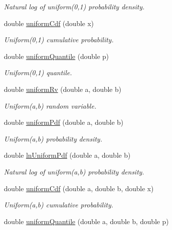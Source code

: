 \begin{DoxyCompactItemize}
\begin{DoxyCompactList}\small\item\em Natural log of uniform(0,1) probability density. \end{DoxyCompactList}\item 
double \mbox{\hyperlink{class_mb_random_aa975313092805421e835bfa934512111}{uniform\+Cdf}} (double x)
\begin{DoxyCompactList}\small\item\em Uniform(0,1) cumulative probability. \end{DoxyCompactList}\item 
double \mbox{\hyperlink{class_mb_random_ade8b412ea092c006f041ac7034e9b102}{uniform\+Quantile}} (double p)
\begin{DoxyCompactList}\small\item\em Uniform(0,1) quantile. \end{DoxyCompactList}\item 
double \mbox{\hyperlink{class_mb_random_a277d841d32f82f756c95b87eb6184ed2}{uniform\+Rv}} (double a, double b)
\begin{DoxyCompactList}\small\item\em Uniform(a,b) random variable. \end{DoxyCompactList}\item 
double \mbox{\hyperlink{class_mb_random_a9db5772a5efc8c19681c46fcbfb60972}{uniform\+Pdf}} (double a, double b)
\begin{DoxyCompactList}\small\item\em Uniform(a,b) probability density. \end{DoxyCompactList}\item 
double \mbox{\hyperlink{class_mb_random_ae9126d13b2ea42cc8f51ec8e400a2ba0}{ln\+Uniform\+Pdf}} (double a, double b)
\begin{DoxyCompactList}\small\item\em Natural log of uniform(a,b) probability density. \end{DoxyCompactList}\item 
double \mbox{\hyperlink{class_mb_random_adbc7c859738c1cc4bcf485fc835db98e}{uniform\+Cdf}} (double a, double b, double x)
\begin{DoxyCompactList}\small\item\em Uniform(a,b) cumulative probability. \end{DoxyCompactList}\item 
double \mbox{\hyperlink{class_mb_random_a086d186a0bc4d52738dd571dc9f0b8e2}{uniform\+Quantile}} (double a, double b, double p)

\end{DoxyCompactItemize}
